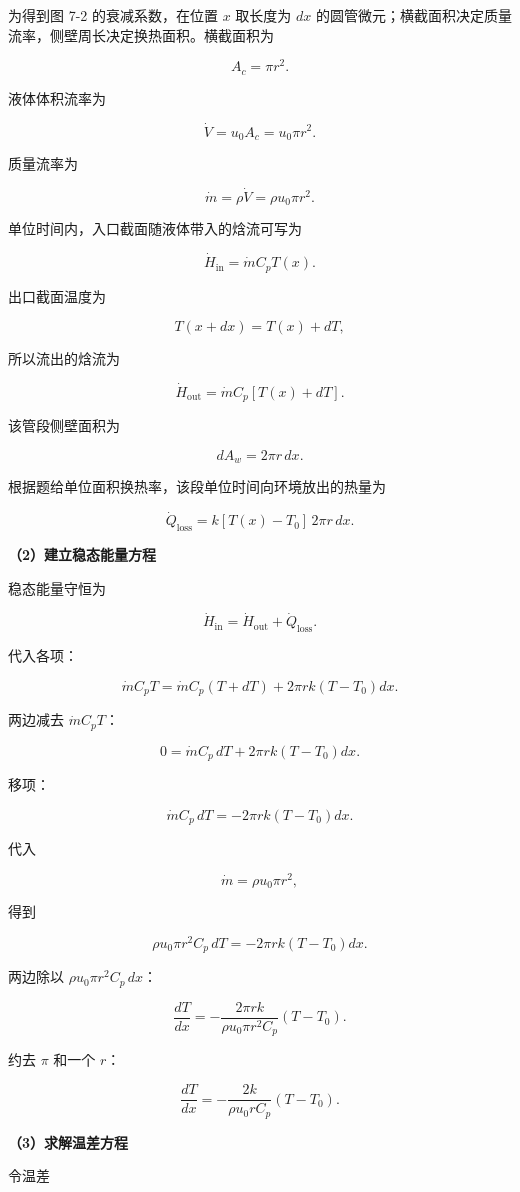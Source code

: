 \documentclass[12pt,a4paper,UTF8]{ctexart}
\begin{document}
为得到图 7-2 的衰减系数，在位置 \(x\) 取长度为 \(dx\)
的圆管微元；横截面积决定质量流率，侧壁周长决定换热面积。横截面积为

\[A_c=\pi r^2.\]

液体体积流率为

\[\dot V=u_0A_c=u_0\pi r^2.\]

质量流率为

\[\dot m=\rho\dot V=\rho u_0\pi r^2.\]

单位时间内，入口截面随液体带入的焓流可写为

\[\dot H_{\mathrm{in}}=\dot m C_pT(x).\]

出口截面温度为

\[T(x+dx)=T(x)+dT,\]

所以流出的焓流为

\[\dot H_{\mathrm{out}}
=\dot m C_p[T(x)+dT].\]

该管段侧壁面积为

\[dA_w=2\pi r\,dx.\]

根据题给单位面积换热率，该段单位时间向环境放出的热量为

\[\dot Q_{\mathrm{loss}}
=k[T(x)-T_0]\,2\pi r\,dx.\]

\textbf{（2）建立稳态能量方程}

稳态能量守恒为

\[\dot H_{\mathrm{in}}
=\dot H_{\mathrm{out}}
+\dot Q_{\mathrm{loss}}.\]

代入各项：

\[\dot mC_pT
=\dot mC_p(T+dT)
+2\pi rk(T-T_0)dx.\]

两边减去 \(\dot mC_pT\)：

\[0=\dot mC_p\,dT
+2\pi rk(T-T_0)dx.\]

移项：

\[\dot mC_p\,dT
=-2\pi rk(T-T_0)dx.\]

代入

\[\dot m=\rho u_0\pi r^2,\]

得到

\[\rho u_0\pi r^2C_p\,dT
=-2\pi rk(T-T_0)dx.\]

两边除以 \(\rho u_0\pi r^2C_p\,dx\)：

\[\frac{dT}{dx}
=-\frac{2\pi rk}{\rho u_0\pi r^2C_p}
(T-T_0).\]

约去 \(\pi\) 和一个 \(r\)：

\[\boxed{
\frac{dT}{dx}
=-\frac{2k}{\rho u_0rC_p}(T-T_0)
}.\]

\textbf{（3）求解温差方程}

令温差
\end{document}
